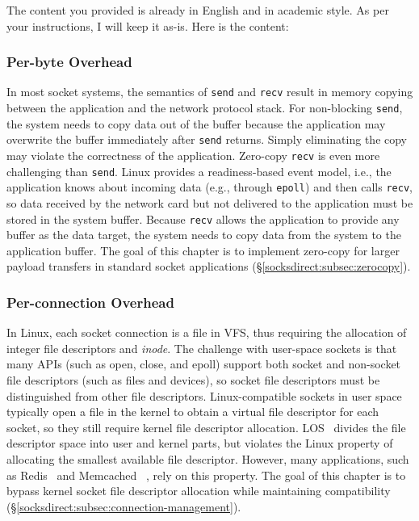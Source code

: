 The content you provided is already in English and in academic style. As per your instructions, I will keep it as-is. Here is the content:

\subsubsection{Per-byte Overhead}
\label{socksdirect:subsec:per-byte-overhead}

In most socket systems, the semantics of \texttt {send} and \texttt {recv} result in memory copying between the application and the network protocol stack. For non-blocking \texttt {send}, the system needs to copy data out of the buffer because the application may overwrite the buffer immediately after \texttt {send} returns. Simply eliminating the copy may violate the correctness of the application. Zero-copy \texttt {recv} is even more challenging than \texttt {send}. Linux provides a readiness-based event model, i.e., the application knows about incoming data (e.g., through \texttt {epoll}) and then calls \texttt {recv}, so data received by the network card but not delivered to the application must be stored in the system buffer. Because \texttt {recv} allows the application to provide any buffer as the data target, the system needs to copy data from the system to the application buffer. The goal of this chapter is to implement zero-copy for larger payload transfers in standard socket applications (\S\ref{socksdirect:subsec:zerocopy}).

\subsubsection{Per-connection Overhead}
\label{socksdirect:subsec:per-connection-overhead}

In Linux, each socket connection is a file in VFS, thus requiring the allocation of integer file descriptors and \emph {inode}.
The challenge with user-space sockets is that many APIs (such as open, close, and epoll) support both socket and non-socket file descriptors (such as files and devices), so socket file descriptors must be distinguished from other file descriptors.
Linux-compatible sockets in user space \cite {libvma,rsockets} typically open a file in the kernel to obtain a virtual file descriptor for each socket, so they still require kernel file descriptor allocation.
LOS~ \cite {huang2017high} divides the file descriptor space into user and kernel parts, but violates the Linux property of allocating the smallest available file descriptor.
However, many applications, such as Redis~ \cite {redis} and Memcached~ \cite {memcached}, rely on this property.
The goal of this chapter is to bypass kernel socket file descriptor allocation while maintaining compatibility (\S\ref{socksdirect:subsec:connection-management}).

